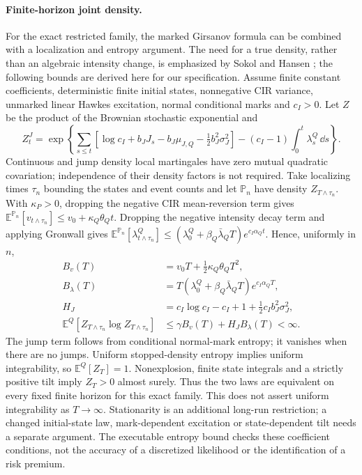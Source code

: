 \paragraph{Finite-horizon joint density.}
For the exact restricted family, the marked Girsanov formula
\cite{schonbucher2001} can be combined with a localization and entropy
argument. The need for a true density, rather than an algebraic intensity
change, is emphasized by Sokol and Hansen \cite{sokol-hansen2015}; the
following bounds are derived here for our specification. Assume finite
constant coefficients, deterministic finite initial states, nonnegative CIR
variance, unmarked linear Hawkes excitation, normal conditional marks and
$c_I>0$. Let $Z$ be the product of the Brownian stochastic exponential and
\begin{equation}
 Z_t^{J}=\exp\!\left\{
 \sum_{s\leq t}\left[\log c_I+b_JJ_s-b_J\mu_{J,Q}
                   -\tfrac12b_J^2\sigma_J^2\right]
 -(c_I-1)\int_0^t\lambda_s^Q\,\dd s\right\}.
\label{eq:pq-jump-density}
\end{equation}
Continuous and jump density local martingales have zero mutual quadratic
covariation; independence of their density factors is not required.
Take localizing times $\tau_n$ bounding the states and event counts and let
$\mathbb P_n$ have density $Z_{T\wedge\tau_n}$. With $\kappa_P>0$, dropping
the negative CIR mean-reversion term gives
$\mathbb E^{\mathbb P_n}[v_{t\wedge\tau_n}]
 \leq v_0+\kappa_Q\theta_Qt$.
Dropping the negative intensity decay term and applying Gronwall gives
$\mathbb E^{\mathbb P_n}[\lambda^Q_{t\wedge\tau_n}]
 \leq(\lambda_0^Q+\beta_Q\bar\lambda_QT)e^{c_I\alpha_Qt}$.
Hence, uniformly in $n$,
\begin{align}
 B_v(T)&=v_0T+\tfrac12\kappa_Q\theta_QT^2,\\
 B_\lambda(T)&=T(\lambda_0^Q+\beta_Q\bar\lambda_QT)e^{c_I\alpha_QT},\\
 H_J&=c_I\log c_I-c_I+1+\tfrac12c_Ib_J^2\sigma_J^2,\\
 \mathbb E^Q[Z_{T\wedge\tau_n}\log Z_{T\wedge\tau_n}]
 &\leq\gamma B_v(T)+H_JB_\lambda(T)<\infty.
\label{eq:pq-joint-entropy}
\end{align}
The jump term follows from conditional normal-mark entropy; it vanishes
when there are no jumps. Uniform stopped-density entropy implies uniform
integrability, so $\mathbb E^Q[Z_T]=1$. Nonexplosion, finite state integrals
and a strictly positive tilt imply $Z_T>0$ almost surely. Thus the two laws
are equivalent on every fixed finite horizon for this exact family.
This does not assert uniform integrability as $T\to\infty$. Stationarity is
an additional long-run restriction; a changed initial-state law,
mark-dependent excitation or state-dependent tilt needs a separate argument.
The executable entropy bound checks these coefficient conditions, not the
accuracy of a discretized likelihood or the identification of a risk premium.

